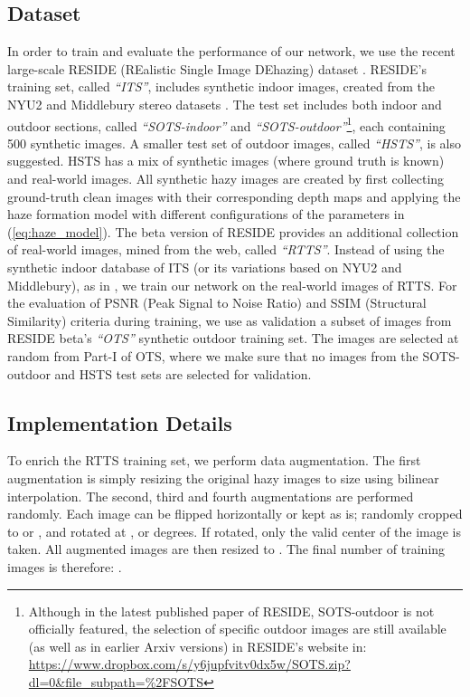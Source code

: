 \documentclass[10pt,twocolumn,twoside]{IEEEtran}
\begin{document}
\subsection{Dataset}
In order to train and evaluate the performance of our network, we use the recent large-scale RESIDE (REalistic Single Image DEhazing) dataset \cite{reside}. RESIDE's training set, called \textit{``ITS''}, includes  synthetic indoor images, created from the NYU2 \cite{NYU2} and Middlebury stereo datasets \cite{middlebury}. The test set includes both indoor and outdoor sections, called \textit{``SOTS-indoor''} and \textit{``SOTS-outdoor''}\footnote{Although in the latest published paper of RESIDE, SOTS-outdoor is not officially featured, the selection of  specific outdoor images are still available (as well as in earlier Arxiv versions) in RESIDE's website in: \url{https://www.dropbox.com/s/y6jupfvitv0dx5w/SOTS.zip?dl=0&file_subpath=\%2FSOTS}},
each containing 500 synthetic images. A smaller test set of  outdoor images, called \textit{``HSTS''}, is also suggested. HSTS has a mix of  synthetic images (where ground truth is known) and  real-world images. All synthetic hazy images are created by first collecting ground-truth clean images with their corresponding depth maps and applying the haze formation model with different configurations of the  parameters in (\ref{eq:haze_model}). The beta version of RESIDE provides an additional collection of  real-world images, mined from the web, called \textit{``RTTS''}. Instead of using the synthetic indoor database of ITS (or its variations based on NYU2 and Middlebury), as in \cite{GFN,mscnn,aodnet,VGG_dehazing}, we train our network on the real-world images of RTTS. For the evaluation of PSNR (Peak Signal to Noise Ratio) and SSIM (Structural Similarity) criteria during training, we use as validation a subset of  images from RESIDE beta's \textit{``OTS''} synthetic outdoor training set. The  images are selected at random from Part-I of OTS, where we make sure that no images from the SOTS-outdoor and HSTS test sets are selected for validation.

\subsection{Implementation Details}
To enrich the RTTS training set, we perform data augmentation. The first augmentation is simply resizing the original hazy images to size  using bilinear interpolation. The second, third and fourth augmentations are performed randomly. Each image can be flipped horizontally or kept as is; randomly cropped to  or , and rotated at , or  degrees. If rotated, only the valid center of the image is taken. All augmented images are then resized to . The final number of training images is therefore: .
\end{document}

